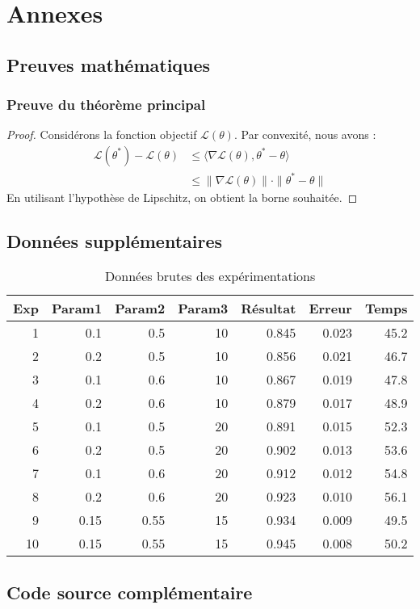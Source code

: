 \chapter*{Annexes}

\section{Preuves mathématiques}

\subsection{Preuve du théorème principal}

\begin{proof}
	Considérons la fonction objectif $\mathcal{L}(\theta)$. Par convexité, nous avons : 
	\begin{align*}
		\mathcal{L}(\theta^*) - \mathcal{L}(\theta) &\leq \langle \nabla\mathcal{L}(\theta), \theta^* - \theta \rangle \\
		&\leq \|\nabla\mathcal{L}(\theta)\| \cdot \|\theta^* - \theta\|
	\end{align*}
	En utilisant l'hypothèse de Lipschitz, on obtient la borne souhaitée.
\end{proof}

\section{Données supplémentaires}

\begin{table}[H]
	\centering
	\caption{Données brutes des expérimentations}
	\begin{tabular}{rrrrrrr}
		\toprule
		\textbf{Exp} & \textbf{Param1} & \textbf{Param2} & \textbf{Param3} & \textbf{Résultat} & \textbf{Erreur} & \textbf{Temps} \\
		\midrule
		1 & 0.1 & 0.5 & 10 & 0.845 & 0.023 & 45.2 \\
		2 & 0.2 & 0.5 & 10 & 0.856 & 0.021 & 46.7 \\
		3 & 0.1 & 0.6 & 10 & 0.867 & 0.019 & 47.8 \\
		4 & 0.2 & 0.6 & 10 & 0.879 & 0.017 & 48.9 \\
		5 & 0.1 & 0.5 & 20 & 0.891 & 0.015 & 52.3 \\
		6 & 0.2 & 0.5 & 20 & 0.902 & 0.013 & 53.6 \\
		7 & 0.1 & 0.6 & 20 & 0.912 & 0.012 & 54.8 \\
		8 & 0.2 & 0.6 & 20 & 0.923 & 0.010 & 56.1 \\
		9 & 0.15 & 0.55 & 15 & 0.934 & 0.009 & 49.5 \\
		10 & 0.15 & 0.55 & 15 & 0.945 & 0.008 & 50.2 \\
		\bottomrule
	\end{tabular}
	\label{tab:raw-data}
\end{table}

\section{Code source complémentaire}

